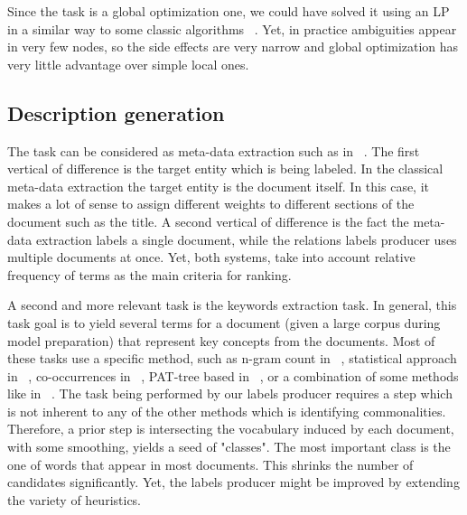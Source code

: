 \documentclass[11pt,a4paper]{article}
\begin{document}
Since the task is a global optimization one, we could have solved it using an LP in a similar way to some classic algorithms ~\cite{aumann1998log}. Yet, in practice ambiguities appear in very few nodes, so the side effects are very narrow and global optimization has very little advantage over simple local ones.

\subsection{Description generation}

The task can be considered as meta-data extraction such as in ~\cite{yilmazel2004metaextract}. The first vertical of difference is the target entity which is being labeled. In the classical meta-data extraction the target entity is the document itself. In this case, it makes a lot of sense to assign different weights to different sections of the document such as the title. A second vertical of difference is the fact the meta-data extraction labels a single document, while the relations labels producer uses multiple documents at once. Yet, both systems, take into account relative frequency of terms as the main criteria for ranking.

A second and more relevant task is the keywords extraction task. In general, this task goal is to yield several terms for a document (given a large corpus during model preparation) that represent key concepts from the documents. Most of these tasks use a specific method, such as n-gram count in ~\cite{cohen1995highlights}, statistical approach in ~\cite{luhn1957statistical}, co-occurrences in ~\cite{matsuo2004keyword}, PAT-tree based in ~\cite{chien1997pat}, or a combination of some methods like in ~\cite{zhang2008automatic}. The task being performed by our labels producer requires a step which is not inherent to any of the other methods which is identifying commonalities. Therefore, a prior step is intersecting the vocabulary induced by each document, with some smoothing, yields a seed of "classes". The most important class is the one of words that appear in most documents. This shrinks the number of candidates significantly. Yet, the labels producer might be improved by extending the variety of heuristics.
\end{document}
